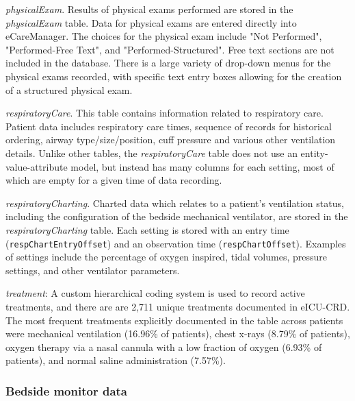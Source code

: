 \documentclass[english]{article}
\newcommand{\colname}[1]{\texttt{#1}}
\newcommand{\tblname}[1]{\emph{#1}}
\begin{document}
\tblname{physicalExam}. Results of physical exams performed are stored in the \tblname{physicalExam} table. Data for physical exams are entered directly into eCareManager. The choices for the physical exam include "Not Performed", "Performed-Free Text", and "Performed-Structured". Free text sections are not included in the database. There is a large variety of drop-down menus for the physical exams recorded, with specific text entry boxes allowing for the creation of a structured physical exam.

\tblname{respiratoryCare}. This table contains information related to respiratory care. Patient data includes respiratory care times, sequence of records for historical ordering, airway type/size/position, cuff pressure and various other ventilation details. Unlike other tables, the \tblname{respiratoryCare} table does not use an entity-value-attribute model, but instead has many columns for each setting, most of which are empty for a given time of data recording.

\tblname{respiratoryCharting}. Charted data which relates to a patient's ventilation status, including the configuration of the bedside mechanical ventilator, are stored in the \tblname{respiratoryCharting} table.
Each setting is stored with an entry time (\colname{respChartEntryOffset}) and an observation time (\colname{respChartOffset}).
Examples of settings include the percentage of oxygen inspired, tidal volumes, pressure settings, and other ventilator parameters.

\tblname{treatment}: A custom hierarchical coding system is used to record
active treatments, and there are are 2,711 unique treatments documented
in eICU-CRD. The most frequent treatments explicitly documented in the table
across patients were mechanical ventilation (16.96\% of patients), chest
x-rays (8.79\% of patients), oxygen therapy via a nasal cannula with a
low fraction of oxygen (6.93\% of patients), and normal saline
administration (7.57\%).



\subsubsection*{Bedside monitor data}\label{monitor-data}
\end{document}
